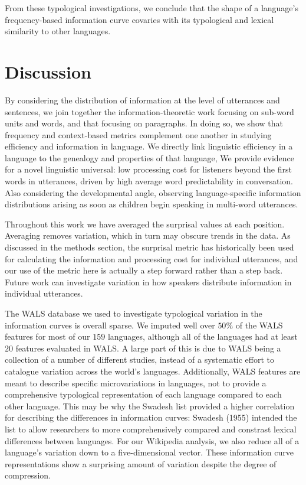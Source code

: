 \documentclass[11pt,]{article}
\begin{document}
From these typological investigations, we conclude that the shape of a language's frequency-based information curve covaries with its typological and lexical similarity to other languages.

\hypertarget{discussion}{%
\section{Discussion}\label{discussion}}

By considering the distribution of information at the level of utterances and sentences, we join together the information-theoretic work focusing on sub-word units and words, and that focusing on paragraphs. In doing so, we show that frequency and context-based metrics complement one another in studying efficiency and information in language. We directly link linguistic efficiency in a language to the genealogy and properties of that language, We provide evidence for a novel linguistic universal: low processing cost for listeners beyond the first words in utterances, driven by high average word predictability in conversation. Also considering the developmental angle, observing language-specific information distributions arising as soon as children begin speaking in multi-word utterances.

Throughout this work we have averaged the surprisal values at each position. Averaging removes variation, which in turn may obscure trends in the data. As discussed in the methods section, the surprisal metric has historically been used for calculating the information and processing cost for individual utterances, and our use of the metric here is actually a step forward rather than a step back. Future work can investigate variation in how speakers distribute information in individual utterances.

The WALS database we used to investigate typological variation in the information curves is overall sparse. We imputed well over \(50\%\) of the WALS features for most of our \(159\) languages, although all of the languages had at least \(20\) features evaluated in WALS. A large part of this is due to WALS being a collection of a number of different studies, instead of a systematic effort to catalogue variation across the world's languages. Additionally, WALS features are meant to describe specific microvariations in languages, not to provide a comprehensive typological representation of each language compared to each other language. This may be why the Swadesh list provided a higher correlation for describing the differences in information curves: Swadesh (1955) intended the list to allow researchers to more comprehensively compared and constrast lexical differences between languages. For our Wikipedia analysis, we also reduce all of a language's variation down to a five-dimensional vector. These information curve representations show a surprising amount of variation despite the degree of compression.
\end{document}
